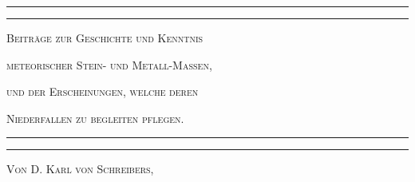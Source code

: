 \documentclass[a4paper, 11pt, oneside, german]{article}
\begin{document}
\begin{titlepage} %
	\centering %

	
	\rule{\textwidth}{1.6pt}\vspace*{-\baselineskip}\vspace*{2pt} %
	\rule{\textwidth}{0.4pt} %
	
	\vspace{1.5\baselineskip} %
	
	{\scshape\LARGE Beiträge zur Geschichte und Kenntnis }
	
	\vspace{1\baselineskip} %

	{\scshape\LARGE meteorischer Stein- und Metall-Massen, }

	\vspace{1\baselineskip} %

 	{\scshape\LARGE und der Erscheinungen, welche deren }

	\vspace{1\baselineskip} %

	{\scshape\LARGE Niederfallen zu begleiten pflegen.}

	\vspace{1.5\baselineskip} %

	\rule{\textwidth}{0.4pt}\vspace*{-\baselineskip}\vspace{3.2pt} %
	\rule{\textwidth}{1.6pt} %
	
	\vspace{1\baselineskip} %
	
	
	{\scshape Von D. Karl von Schreibers,} %
	
	\vspace*{1\baselineskip} %
	

\end{titlepage}
\end{document}
